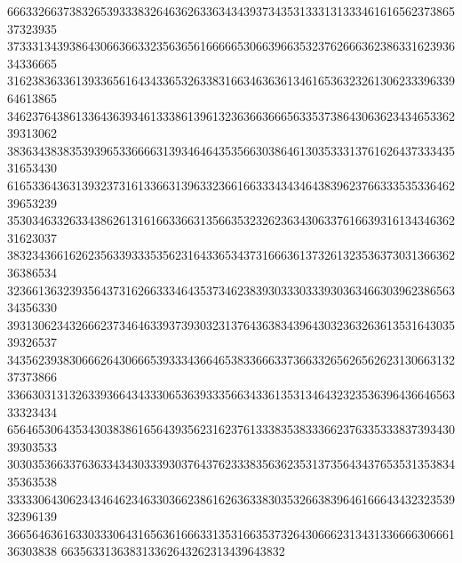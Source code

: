 66633266373832653933383264636263363434393734353133313133346161656237386537323935
37333134393864306636633235636561666665306639663532376266636238633162393634336665
31623836336139336561643433653263383166346363613461653632326130623339633964613865
34623764386133643639346133386139613236366366656335373864306362343465336239313062
38363438383539396533666631393464643535663038646130353331376162643733343531653430
61653364363139323731613366313963323661663334343464383962376633353533646239653239
35303463326334386261316166336631356635323262363430633761663931613434636231623037
38323436616262356339333535623164336534373166636137326132353637303136636236386534
32366136323935643731626633346435373462383930333033393036346630396238656334356330
39313062343266623734646339373930323137643638343964303236326361353164303539326537
34356239383066626430666539333436646538336663373663326562656262313066313237373866
33663031313263393664343330653639333566343361353134643232353639643664656333323434
65646530643534303838616564393562316237613338353833366237633533383739343039303533
30303536633763633434303339303764376233383563623531373564343765353135383435363538
33333064306234346462346330366238616263633830353266383964616664343232353932396139
36656463616330333064316563616663313531663537326430666231343133666630666136303838
663563313638313362643262313439643832
